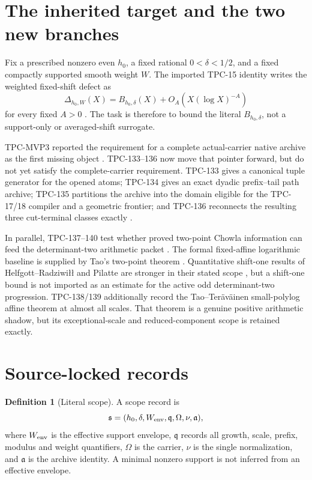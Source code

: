 \documentclass[11pt]{article}
\theoremstyle{definition}
\newtheorem{definition}[theorem]{Definition}
\theoremstyle{remark}
\newcommand{\Bhard}{B_{h_0,\delta}}
\begin{document}
\section{The inherited target and the two new branches}

Fix a prescribed nonzero even \(h_0\), a fixed rational
\(0<\delta<1/2\), and a fixed compactly supported smooth weight
\(W\).  The imported TPC-15 identity writes the weighted fixed-shift
defect as
\begin{equation}
 \Delta_{h_0,W}(X)
 =
 \Bhard(X)+O_A\!\left(X(\log X)^{-A}\right)
\label{eq:anchor}
\end{equation}
for every fixed \(A>0\) \citep{WangTPC15}.  The task is therefore to
bound the literal \(\Bhard\), not a support-only or averaged-shift
surrogate.

TPC-MVP3 reported the requirement for a complete actual-carrier
native archive as the first missing object \citep{WangTPC132}.
TPC-133--136 now move that pointer forward, but do not yet satisfy the
complete-carrier requirement.  TPC-133 gives a canonical tuple
generator for the opened atoms; TPC-134 gives an exact dyadic
prefix--tail path archive; TPC-135 partitions the archive into the
domain eligible for the TPC-17/18 compiler and a geometric frontier;
and TPC-136 reconnects the resulting three cut-terminal classes
exactly
\citep{WangTPC133,WangTPC134,WangTPC135,WangTPC136}.

In parallel, TPC-137--140 test whether proved two-point Chowla
information can feed the determinant-two arithmetic packet
\citep{WangTPC137,WangTPC138,WangTPC139,WangTPC140}.  The formal
fixed-affine logarithmic baseline is supplied by Tao's two-point
theorem \citep{Tao2016}.  Quantitative shift-one results of
Helfgott--Radziwi{\l}{\l} and Pilatte are stronger in their stated
scope \citep{HelfgottRadziwill2021,Pilatte2025}, but a shift-one
bound is not imported as an estimate for the active odd
determinant-two progression.  TPC-138/139 additionally record the
Tao--Ter\"av\"ainen small-polylog affine theorem at almost all scales.
That theorem is a genuine positive arithmetic shadow, but its
exceptional-scale and reduced-component scope is retained exactly.

\section{Source-locked records}

\begin{definition}[Literal scope]
A scope record is
\[
 {\mathfrak s}
 =
 (h_0,\delta,W_{\rm env},{\mathfrak q},\Omega,\nu,{\mathfrak a}),
\]
where \(W_{\rm env}\) is the effective support envelope,
\({\mathfrak q}\) records all growth, scale, prefix, modulus and
weight quantifiers, \(\Omega\) is the carrier, \(\nu\) is the single
normalization, and \({\mathfrak a}\) is the archive identity.  A
minimal nonzero support is not inferred from an effective envelope.
\end{definition}
\end{document}
